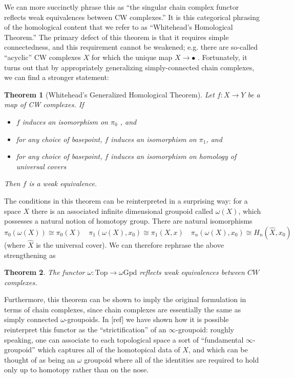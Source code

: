 \documentclass[12pt]{article}
\newtheorem{theorem}{Theorem}[section]
\theoremstyle{definition}
\begin{document}
	We can more succinctly phrase this as ``the singular chain complex functor reflects weak equivalences between CW complexes.'' 
	It is this categorical phrasing of the homological content that we refer to as ``Whitehead's Homological Theorem.'' The primary defect of this theorem is that it requires simple connectedness, and this requirement cannot be weakened; e.g. there are so-called ``acyclic'' CW complexes $X$ for which the unique map $X \to \bullet$ . Fortunately, it turns out that by appropriately generalizing simply-connected chain complexes, we can find a stronger statement:
	\begin{theorem}[Whitehead's Generalized Homological Theorem]
		Let $f: X \to Y$ be a map of CW complexes. If
		\begin{itemize}
			\item $f$ induces an isomorphism on $\pi_0$ , and
			\item for any choice of basepoint, $f$ induces an isomorphism on $\pi_1$, and
			\item for any choice of basepoint, $f$ induces an isomorphism on homology of universal covers 
		\end{itemize}
		Then $f$ is a weak equivalence.
	\end{theorem}
	The conditions in this theorem can be reinterpreted in a surprising way: for a space $X$ there is an associated infinite dimensional groupoid called $\omega(X)$, which possesses a natural notion of homotopy group. There are natural isomorphisms
	$$\pi_0(\omega(X)) \cong \pi_0(X) \quad \pi_1(\omega(X), x_0) \cong \pi_1(X,x) \quad \pi_n(\omega(X),x_0) \cong H_n(\widehat{X}, x_0)$$
	(where $\widehat{X}$ is the universal cover). We can therefore rephrase the above strengthening as 
	\begin{theorem}
		The functor $\omega: \text{Top} \to \omega\text{Gpd}$ reflects weak equivalences between $CW$ complexes.
	\end{theorem}		
	Furthermore, this theorem can be shown to imply the original formulation in terms of chain complexes, since chain complexes are essentially the same as simply connected $\omega$-groupoids.
	In [ref] we have shown how it is possible reinterpret this functor as the ``strictification'' of an $\infty$-groupoid: roughly speaking, one can associate to each topological space a sort of ``fundamental $\infty$-groupoid'' which captures all of the homotopical data of $X$, and which can be thought of as being an $\omega$ groupoid where all of the identities are required to hold only up to homotopy rather than on the nose. 
\end{document}
